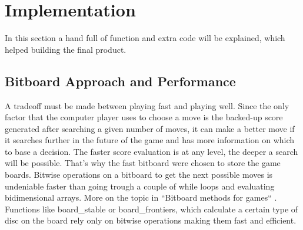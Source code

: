 
\chapter{Implementation}\label{chapter:implementation}
In this section a hand full of function and extra code will be explained, which helped building the final product.
\section{Bitboard Approach and Performance}
A tradeoff must be made between playing fast and playing well. Since the only factor that the computer player uses to choose a move is the backed-up score generated after searching a given number of moves, it can make a better move if it searches further in the future of the game and has more information on which to base a decision. The faster score evaluation is at any level, the deeper a search will be possible. That’s why the fast bitboard were chosen to store the game boards. Bitwise operations on a bitboard to get the next possible moves is undeniable faster than going trough a couple of while loops and evaluating bidimensional arrays. More on the topic in “Bitboard methods for games“ \cite{quteprints85005}. Functions like board\_stable or board\_frontiers, which calculate a certain type of disc on the board rely only on bitwise operations making them fast and efficient.
